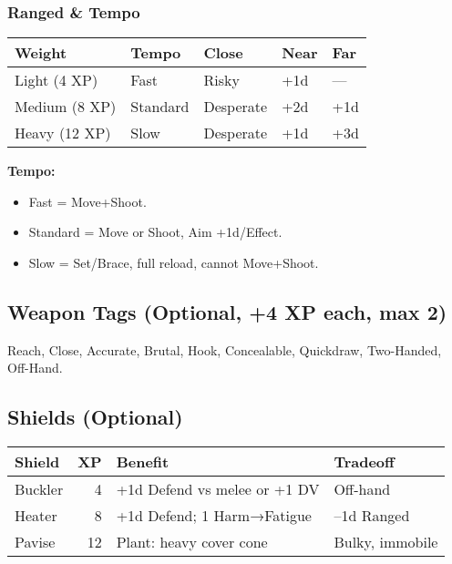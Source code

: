 \documentclass[11pt,twoside,openany]{book}
\begin{document}
\subsubsection*{Ranged \& Tempo}

\begin{center}
\begin{tabular}{|l|l|l|l|l|}
\hline
\textbf{Weight} & \textbf{Tempo} & \textbf{Close} & \textbf{Near} & \textbf{Far} \\
\hline
Light (4 XP) & Fast & Risky & +1d & — \\
Medium (8 XP) & Standard & Desperate & +2d & +1d \\
Heavy (12 XP) & Slow & Desperate & +1d & +3d \\
\hline
\end{tabular}
\end{center}

\textbf{Tempo:} 
\begin{itemize}
\item Fast = Move+Shoot. 
\item Standard = Move or Shoot, Aim +1d/Effect. 
\item Slow = Set/Brace, full reload, cannot Move+Shoot.
\end{itemize}

\subsection*{Weapon Tags (Optional, +4 XP each, max 2)}

Reach, Close, Accurate, Brutal, Hook, Concealable, Quickdraw, Two-Handed, Off-Hand.

\subsection*{Shields (Optional)}

\begin{center}
\begin{tabular}{|l|r|l|l|}
\hline
\textbf{Shield} & \textbf{XP} & \textbf{Benefit} & \textbf{Tradeoff} \\
\hline
Buckler & 4 & +1d Defend vs melee or +1 DV & Off-hand \\
Heater & 8 & +1d Defend; 1 Harm→Fatigue & –1d Ranged \\
Pavise & 12 & Plant: heavy cover cone & Bulky, immobile \\
\hline
\end{tabular}
\end{center}
\end{document}
